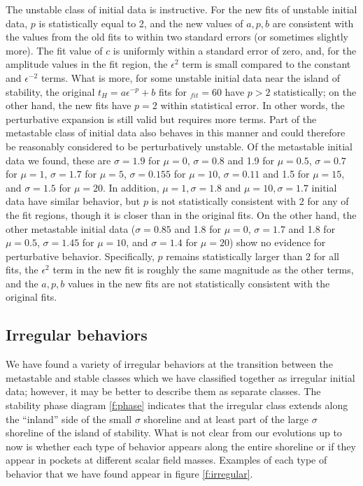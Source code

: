 \documentclass[../PhD.tex]{subfiles}
\begin{document}
The unstable class of initial data is instructive. For the new fits of
unstable initial data, $p$ is statistically equal to 2, and the new values
of $a,p,b$ are consistent with the values from the old fits to within two
standard errors (or sometimes slightly more). The fit value of $c$ is 
uniformly within a standard error of zero, and, for the amplitude values
in the fit region, the $\epsilon^2$ term is small compared to the constant
and $\epsilon^{-2}$ terms. What is more, for some unstable initial data near
the island of stability, the original $t_H=a\epsilon^{-p}+b$ fits for 
$_{fit}=60$ have $p>2$ statistically; on the other hand, the new fits have 
$p=2$ within statistical error. In other words, the perturbative expansion
is still valid but requires more terms. Part of the metastable class of
initial data also behaves in this manner and could therefore be reasonably
considered to be perturbatively unstable. Of the metastable initial
data we found, these are $\sigma=1.9$ for $\mu=0$, $\sigma=0.8$ and 1.9 
for $\mu=0.5$, $\sigma=0.7$ for $\mu=1$, $\sigma=1.7$ for $\mu=5$, 
$\sigma=0.155$ for $\mu=10$, $\sigma=0.11$ and 1.5 for $\mu=15$, and 
$\sigma=1.5$ for $\mu=20$. In addition, $\mu=1,\sigma=1.8$ and 
$\mu=10,\sigma=1.7$ initial data have similar behavior, but $p$ is not
statistically consistent with 2 for any of the fit regions, though it is
closer than in the original fits. On the other hand, the other metastable
initial data ($\sigma=0.85$ and 1.8 for $\mu=0$, $\sigma=1.7$ and 1.8 for 
$\mu=0.5$, $\sigma=1.45$ for $\mu=10$, and $\sigma=1.4$ for $\mu=20$) show 
no evidence for perturbative behavior. Specifically, $p$ remains statistically
larger than 2 for all fits, the $\epsilon^2$ term in the new fit is roughly
the same magnitude as the other terms, and the $a,p,b$ values in the new
fits are not statistically consistent with the original fits.



\subsection{Irregular behaviors}

We have found a variety of irregular behaviors at the transition
between the metastable and stable classes which we have classified together
as irregular initial data; however, it may be better to describe them as
separate classes.  The stability phase diagram \ref{f:phase} indicates that the
irregular class extends along the ``inland'' side of the small $\sigma$
shoreline and at least part of the large $\sigma$ shoreline
of the island of stability.  What is not clear from our evolutions up to
now is whether each type of behavior appears along the entire shoreline
or if they appear in pockets at different scalar field masses. Examples
of each type of behavior that we have found appear in figure \ref{f:irregular}.
\end{document}
